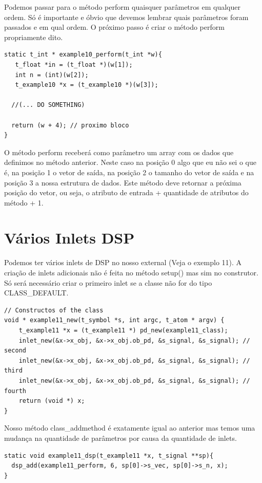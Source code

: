 \documentclass[10pt,a4paper]{report}
\begin{document}
Podemos passar para o método perform quaisquer parâmetros em qualquer ordem. Só é importante e óbvio que devemos lembrar quais parâmetros foram passados e em qual ordem. O próximo passo é criar o método perform propriamente dito.

\begin{lstlisting}
static t_int * example10_perform(t_int *w){
   t_float *in = (t_float *)(w[1]);
   int n = (int)(w[2]);
   t_example10 *x = (t_example10 *)(w[3]);

  //(... DO SOMETHING)

  return (w + 4); // proximo bloco
}
\end{lstlisting}

O método perform receberá como parâmetro um array com os dados que definimos no método anterior. Neste caso na posição 0 algo que eu não sei o que é, na posição 1 o vetor de saída, na posição 2 o tamanho do vetor de saída e na posição 3 a nossa estrutura de dados. Este método deve retornar a próxima posição do vetor, ou seja, o atributo de entrada + quantidade de atributos do método + 1.

\section{Vários Inlets DSP}
Podemos ter vários inlets de DSP no nosso external (Veja o exemplo 11). A criação de inlets adicionais não é feita no método setup() mas sim no construtor. Só será necessário criar o primeiro inlet se a classe não for do tipo CLASS\_DEFAULT.

\begin{lstlisting}
// Constructos of the class
void * example11_new(t_symbol *s, int argc, t_atom * argv) {
    t_example11 *x = (t_example11 *) pd_new(example11_class);
    inlet_new(&x->x_obj, &x->x_obj.ob_pd, &s_signal, &s_signal); // second
    inlet_new(&x->x_obj, &x->x_obj.ob_pd, &s_signal, &s_signal); // third
    inlet_new(&x->x_obj, &x->x_obj.ob_pd, &s_signal, &s_signal); // fourth
    return (void *) x;
}
\end{lstlisting}

Nosso método class\_addmethod é exatamente igual ao anterior mas temos uma mudança na quantidade de parâmetros por causa da quantidade de inlets.

\begin{lstlisting}
static void example11_dsp(t_example11 *x, t_signal **sp){
  dsp_add(example11_perform, 6, sp[0]->s_vec, sp[0]->s_n, x);
}
\end{lstlisting}
\end{document}
